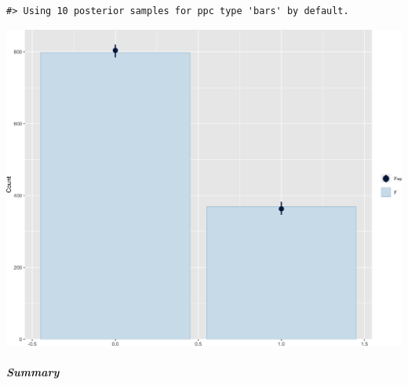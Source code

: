 \documentclass[
]{article}
\begin{document}
\begin{verbatim}
#> Using 10 posterior samples for ppc type 'bars' by default.
\end{verbatim}

\begin{center}\includegraphics[width=1\linewidth]{notebook_files/figure-latex/model1reduced_ppcheck-1} \end{center}

\hypertarget{summary-1}{%
\subparagraph{Summary}\label{summary-1}}
\end{document}
